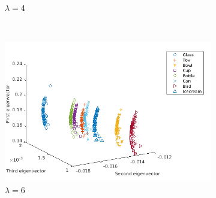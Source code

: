 \documentclass[10pt,a4paper]{article}
\theoremstyle{plain}
\theoremstyle{definition}
\begin{document}
\begin{figure}[H]
\begin{subfigure}[b]{0.5\textwidth}
		\caption{$\lambda=4$}
		\label{}
	\end{subfigure}~
	\begin{subfigure}[b]{0.5\textwidth}
		\includegraphics[width= \textwidth]{images/Zeta-Laplace6.png}
		\caption{$\lambda=6$}
		\label{}
	\end{subfigure}
	\caption{ }
	\label{}
\end{figure}

\newpage
\renewcommand{\bibname}{References}
\nocite{*}


\end{document}
